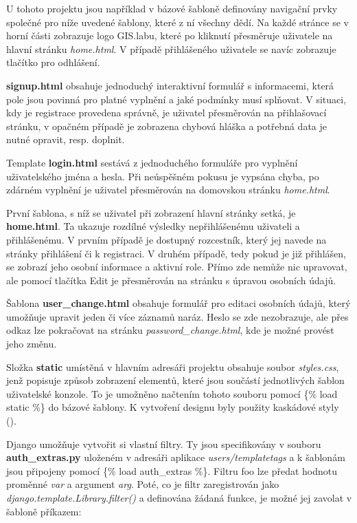 U tohoto projektu jsou například v bázové šabloně definovány navigační
prvky společné pro níže uvedené šablony, které z ní všechny dědí. Na
každé stránce se v horní části zobrazuje logo GIS.labu, které po
kliknutí přesměruje uživatele na hlavní stránku \textit{home.html}. V
případě přihlášeného uživatele se navíc zobrazuje tlačítko pro
odhlášení.

\textbf{signup.html} obsahuje jednoduchý interaktivní formulář s
informacemi, která pole jsou povinná pro platné vyplnění a jaké
podmínky musí splňovat. V situaci, kdy je registrace provedena
správně, je uživatel přesměrován na přihlašovací stránku, v opačném
případě je zobrazena chybová hláška a potřebná data je nutné opravit,
resp. doplnit.

Template \textbf{login.html} sestává z jednoduchého formuláře pro
vyplnění uživatelského jména a hesla. Při neúspěšném pokusu je vypsána
chyba, po zdárném vyplnění je uživatel přesměrován na domovskou
stránku \textit{home.html}.

První šablona, s níž se uživatel při zobrazení hlavní stránky setká,
je \textbf{home.html}. Ta ukazuje rozdílné výsledky nepřihlášenému
uživateli a přihlášenému. V prvním případě je dostupný rozcestník,
který jej navede na stránky přihlášení či k registraci. V druhém
případě, tedy pokud je již přihlášen, se zobrazí jeho osobní informace
a aktivní role. Přímo zde nemůže nic upravovat, ale pomocí tlačítka
\textsf{Edit} je přesměrován na stránku s úpravou osobních údajů.

Šablona \textbf{user\_change.html} obsahuje formulář pro editaci
osobních údajů, který umožňuje upravit jeden či více záznamů
naráz. Heslo se zde nezobrazuje, ale přes odkaz lze pokračovat na
stránku \textit{password\_change.html}, kde je možné provést jeho
změnu.

Složka \textbf{static} umístěná v hlavním adresáři projektu obsahuje
soubor \textit{styles.css}, jenž popisuje způsob zobrazení elementů,
které jsou součástí jednotlivých šablon uživatelské konzole. To je
umožněno načtením tohoto souboru pomocí \textsf{\{\% load static \%\}}
do bázové šablony. K vytvoření designu byly použity kaskádové styly
().

Django umožňuje vytvořit si vlastní filtry. Ty jsou specifikovány v
souboru \textbf{auth\_extras.py} uloženém v adresáři aplikace
\textit{users/templatetags} a k šablonám jsou připojeny pomocí
\textsf{\{\% load auth\_extras \%\}}. Filtru \textsf{foo} lze předat
hodnotu proměnné \textit{var} a argument \textit{arg}. Poté, co je
filtr zaregistrován jako \textit{django.template.Library.filter()} a
definována žádaná funkce, je možné jej zavolat v šabloně příkazem:

